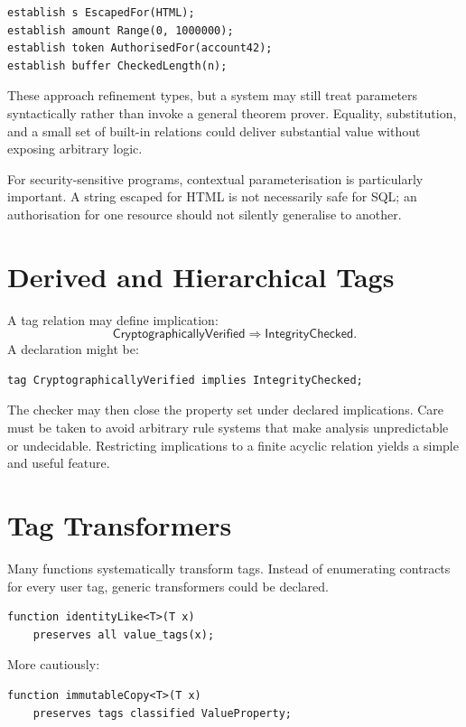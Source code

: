 \documentclass[11pt]{article}
\begin{document}
\begin{lstlisting}
establish s EscapedFor(HTML);
establish amount Range(0, 1000000);
establish token AuthorisedFor(account42);
establish buffer CheckedLength(n);
\end{lstlisting}

These approach refinement types, but a system may still treat parameters syntactically rather than invoke a general theorem prover. Equality, substitution, and a small set of built-in relations could deliver substantial value without exposing arbitrary logic.

For security-sensitive programs, contextual parameterisation is particularly important. A string escaped for HTML is not necessarily safe for SQL; an authorisation for one resource should not silently generalise to another.

\section{Derived and Hierarchical Tags}
A tag relation may define implication:
\[
\textsf{CryptographicallyVerified} \Rightarrow \textsf{IntegrityChecked}.
\]
A declaration might be:

\begin{lstlisting}
tag CryptographicallyVerified implies IntegrityChecked;
\end{lstlisting}

The checker may then close the property set under declared implications. Care must be taken to avoid arbitrary rule systems that make analysis unpredictable or undecidable. Restricting implications to a finite acyclic relation yields a simple and useful feature.

\section{Tag Transformers}
Many functions systematically transform tags. Instead of enumerating contracts for every user tag, generic transformers could be declared.

\begin{lstlisting}
function identityLike<T>(T x)
    preserves all value_tags(x);
\end{lstlisting}

More cautiously:

\begin{lstlisting}
function immutableCopy<T>(T x)
    preserves tags classified ValueProperty;
\end{lstlisting}
\end{document}
